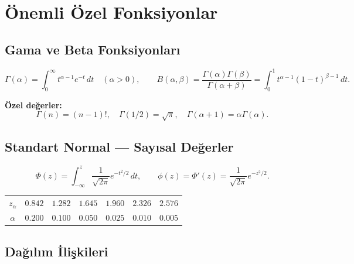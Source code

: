 \section{Önemli Özel Fonksiyonlar}
\label{app:ozel_fonksiyonlar}

\subsection{Gama ve Beta Fonksiyonları}

\[
  \Gamma(\alpha) = \int_0^\infty t^{\alpha-1}e^{-t}\,dt \quad (\alpha>0), \qquad
  B(\alpha,\beta) = \frac{\Gamma(\alpha)\Gamma(\beta)}{\Gamma(\alpha+\beta)} = \int_0^1 t^{\alpha-1}(1-t)^{\beta-1}\,dt.
\]

\noindent\textbf{Özel değerler:}
\[
  \Gamma(n) = (n-1)!, \quad \Gamma(1/2)=\sqrt{\pi}, \quad \Gamma(\alpha+1)=\alpha\Gamma(\alpha).
\]

\subsection{Standart Normal — Sayısal Değerler}

\[
  \Phi(z) = \int_{-\infty}^z\frac{1}{\sqrt{2\pi}}e^{-t^2/2}\,dt, \qquad \phi(z)=\Phi'(z)=\frac{1}{\sqrt{2\pi}}e^{-z^2/2}.
\]

\begin{center}
\begin{tabular}{ccccccc}
\hline
$z_\alpha$ & $0.842$ & $1.282$ & $1.645$ & $1.960$ & $2.326$ & $2.576$ \\
$\alpha$ & $0.200$ & $0.100$ & $0.050$ & $0.025$ & $0.010$ & $0.005$ \\
\hline
\end{tabular}
\end{center}

\subsection{Dağılım İlişkileri}

